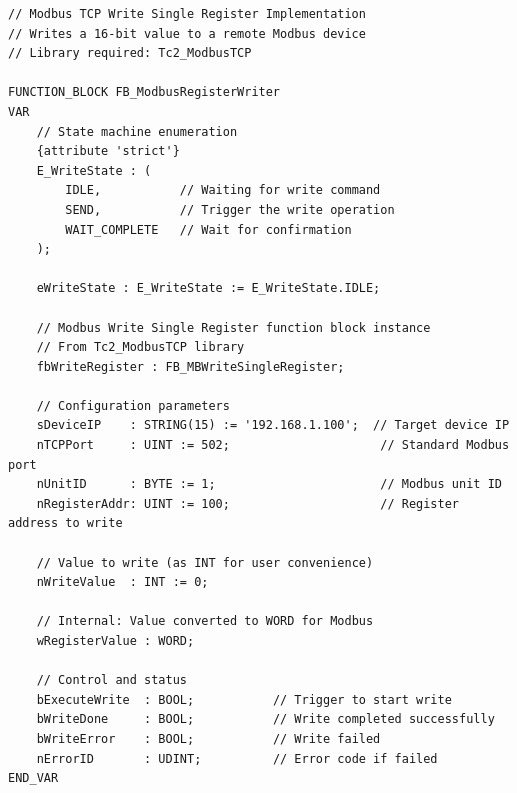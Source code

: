 \documentclass[11pt,a4paper]{article}
\begin{document}
\begin{lstlisting}
// Modbus TCP Write Single Register Implementation
// Writes a 16-bit value to a remote Modbus device
// Library required: Tc2_ModbusTCP

FUNCTION_BLOCK FB_ModbusRegisterWriter
VAR
    // State machine enumeration
    {attribute 'strict'}
    E_WriteState : (
        IDLE,           // Waiting for write command
        SEND,           // Trigger the write operation
        WAIT_COMPLETE   // Wait for confirmation
    );
    
    eWriteState : E_WriteState := E_WriteState.IDLE;
    
    // Modbus Write Single Register function block instance
    // From Tc2_ModbusTCP library
    fbWriteRegister : FB_MBWriteSingleRegister;
    
    // Configuration parameters
    sDeviceIP    : STRING(15) := '192.168.1.100';  // Target device IP
    nTCPPort     : UINT := 502;                     // Standard Modbus port
    nUnitID      : BYTE := 1;                       // Modbus unit ID
    nRegisterAddr: UINT := 100;                     // Register address to write
    
    // Value to write (as INT for user convenience)
    nWriteValue  : INT := 0;
    
    // Internal: Value converted to WORD for Modbus
    wRegisterValue : WORD;
    
    // Control and status
    bExecuteWrite  : BOOL;           // Trigger to start write
    bWriteDone     : BOOL;           // Write completed successfully
    bWriteError    : BOOL;           // Write failed
    nErrorID       : UDINT;          // Error code if failed
END_VAR
\end{lstlisting}
\end{document}
